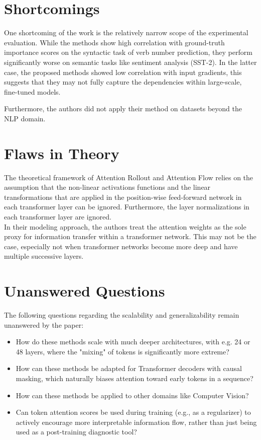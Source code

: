\documentclass[12pt,a4paper]{article}
\begin{document}
\section{Shortcomings}

One shortcoming of the work is the relatively narrow scope of the experimental evaluation. While the methods show high correlation with ground-truth importance scores on the syntactic task of verb number prediction, they perform significantly worse on semantic tasks like sentiment analysis (SST-2). In the latter case, the proposed methods showed low correlation with input gradients, this suggests that they may not fully capture the dependencies within large-scale, fine-tuned models.

Furthermore, the authors did not apply their method on datasets beyond the NLP domain. 

\section{Flaws in Theory}

The theoretical framework of Attention Rollout and Attention Flow relies on the assumption that the non-linear activations functions and the linear transformations that are applied in the position-wise feed-forward network in each transformer layer can be ignored. Furthermore, the layer normalizations in each transformer layer are ignored. \\

In their modeling approach, the authors treat the attention weights as the sole proxy for information transfer within a transformer network. This may not be the case, especially not when transformer networks become more deep and have multiple successive layers.


\section{Unanswered Questions}

The following questions regarding the scalability and generalizability remain unanswered by the paper:
\begin{itemize}
    \item How do these methods scale with much deeper architectures, with e.g. 24 or 48 layers, where the "mixing" of tokens is significantly more extreme?
    \item How can these methods be adapted for Transformer decoders with causal masking, which naturally biases attention toward early tokens in a sequence?~\cite{abnar-zuidema-2020-quantifying}
    \item How can these methods be applied to other domains like Computer Vision?
    \item Can token attention scores be used during training (e.g., as a regularizer) to actively encourage more interpretable information flow, rather than just being used as a post-training diagnostic tool?
\end{itemize}
\end{document}

